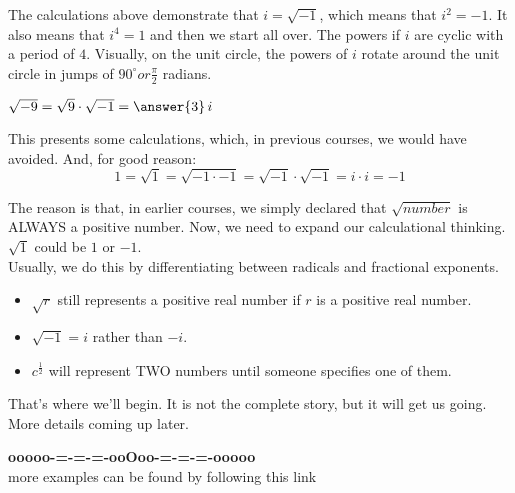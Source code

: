 \documentclass{ximera}
\begin{document}
The calculations above demonstrate that $i = \sqrt{-1}$, which means that $i^2 = -1$.  It also means that $i^4 = 1$ and then we start all over.  The powers if $i$ are cyclic with a period of $4$.  Visually, on the unit circle, the powers of $i$ rotate around the unit circle in jumps of $90^{\circ} or \frac{\pi}{2}$ radians.

\begin{question}


$\sqrt{-9} = \sqrt{9} \cdot \sqrt{-1} =  \answer{3} \, i$

\end{question}

This presents some calculations, which, in previous courses, we would have avoided. And, for good reason:\\

\[  1 = \sqrt{1} = \sqrt{-1 \cdot -1} = \sqrt{-1} \cdot \sqrt{-1} = i \cdot i = -1   \]


The reason is that, in earlier courses, we simply declared that $\sqrt{number}$ is ALWAYS a positive number.  Now, we need to expand our calculational thinking. $\sqrt{1}$ could be $1$ or $-1$. \\

Usually, we do this by differentiating between radicals and fractional exponents.\\

\begin{itemize}
\item $\sqrt{r}$ still represents a positive real number if $r$ is a positive real number.
\item $\sqrt{-1} = i$ rather than $-i$.
\item $c^{\tfrac{1}{2}}$ will represent TWO numbers until someone specifies one of them.
\end{itemize}

That's where we'll begin.  It is not the complete story, but it will get us going.  More details coming up later.

















\begin{center}
\textbf{\textcolor{green!50!black}{ooooo-=-=-=-ooOoo-=-=-=-ooooo}} \\

more examples can be found by following this link\\ 

\end{center}
\end{document}
